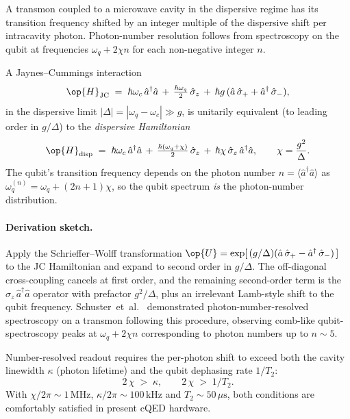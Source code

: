 \begin{phenomenon}
A transmon coupled to a microwave cavity in the dispersive regime
has its transition frequency shifted by an integer multiple of
the dispersive shift per intracavity photon. Photon-number
resolution follows from spectroscopy on the qubit at frequencies
$\omega_q + 2\chi n$ for each non-negative integer $n$.
\end{phenomenon}

\begin{statement}
\label{stmt:dispersive-H}
A Jaynes--Cummings interaction
\begin{equation}
\op{H}_{\rm JC} \;=\; \hbar\omega_c\,\hat a^\dagger\hat a
\,+\, \tfrac{\hbar\omega_q}{2}\,\hat\sigma_z
\,+\, \hbar g\,(\hat a\,\hat\sigma_+ + \hat a^\dagger\,\hat\sigma_-),
\end{equation}
in the dispersive limit $|\Delta|=|\omega_q-\omega_c|\gg g$, is
unitarily equivalent (to leading order in $g/\Delta$) to the
\emph{dispersive Hamiltonian}
\begin{equation}
\label{eq:dispersive-H}
\op{H}_{\rm disp} \;=\; \hbar\omega_c\,\hat a^\dagger\hat a
\,+\, \tfrac{\hbar(\omega_q+\chi)}{2}\,\hat\sigma_z
\,+\, \hbar\chi\,\hat\sigma_z\,\hat a^\dagger\hat a,
\qquad \chi=\frac{g^2}{\Delta}.
\end{equation}
The qubit's transition frequency depends on the photon number
$n=\langle\hat a^\dagger\hat a\rangle$ as
$\omega_q^{(n)}=\omega_q+(2n+1)\chi$, so the qubit spectrum
\emph{is} the photon-number distribution.
\end{statement}

\paragraph{Derivation sketch.}
Apply the Schrieffer--Wolff transformation
$\op{U}=\exp[\,(g/\Delta)(\hat a\,\hat\sigma_+ - \hat a^\dagger\,\hat\sigma_-)\,]$
to the JC Hamiltonian and expand to second order in $g/\Delta$.
The off-diagonal cross-coupling cancels at first order, and the
remaining second-order term is the $\sigma_z\,\hat a^\dagger\hat a$
operator with prefactor $g^2/\Delta$, plus an irrelevant Lamb-style
shift to the qubit frequency. Schuster~et~al.~\cite{schuster2007}
demonstrated photon-number-resolved spectroscopy on a transmon
following this procedure, observing comb-like qubit-spectroscopy
peaks at $\omega_q + 2\chi n$ corresponding to photon numbers up
to $n\sim 5$.

\begin{statement}
\label{stmt:disp-resolution}
Number-resolved readout requires the per-photon shift to exceed
both the cavity linewidth $\kappa$ (photon lifetime) and the
qubit dephasing rate $1/T_2$:
\begin{equation}
\label{eq:photon-resolution}
2\,\chi \;>\; \kappa,\qquad
2\,\chi \;>\; 1/T_2.
\end{equation}
With $\chi/2\pi\sim 1\,\text{MHz}$, $\kappa/2\pi\sim 100\,\text{kHz}$
and $T_2\sim 50\,\mu\text{s}$, both conditions are comfortably
satisfied in present cQED hardware.
\end{statement}

